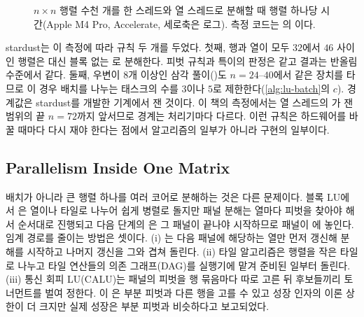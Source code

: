\begin{figure}[htbp]
\centering
{}
\caption{$n\times n$ 행렬 수천 개를 한 스레드와 열 스레드로 분해할 때 행렬 하나당 시간(Apple M4 Pro, Accelerate, 세로축은 로그). 측정 코드는 의 이다.}
\label{fig:lu-amx}
\end{figure}

stardust는 이 측정에 따라 규칙 두 개를 두었다. 첫째, 행과 열이 모두 $32$에서 $46$ 사이인 행렬은  대신 블록 없는 로 분해한다. 피벗 규칙과 특이의 판정은 같고 결과는 반올림 수준에서 같다. 둘째, 우변이 $8$개 이상인 삼각 풀이()도 $n=24$--$40$에서 같은 장치를 타므로 이 경우 배치를 나누는 태스크의 수를 $3$이나 $5$로 제한한다(\cref{alg:lu-batch}의 $c$). 경계값은 stardust를 개발한 기계에서 잰 것이다. 이 책의 측정에서는 열 스레드의 가 잰 범위의 끝 $n=72$까지 앞서므로 경계는 처리기마다 다르다. 이런 규칙은 하드웨어를 바꿀 때마다 다시 재야 한다는 점에서 알고리즘의 일부가 아니라 구현의 일부이다.

\subsection{Parallelism Inside One Matrix}

배치가 아니라 큰 행렬 하나를 여러 코어로 분해하는 것은 다른 문제이다. 블록 LU에서 은 열이나 타일로 나누어 쉽게 병렬로 돌지만 패널 분해는 열마다 피벗을 찾아야 해서 순서대로 진행되고 다음 단계의 은 그 패널이 끝나야 시작하므로 패널이 에 놓인다. 임계 경로를 줄이는 방법은 셋이다. (i) 는 다음 패널에 해당하는 열만 먼저 갱신해 분해를 시작하고 나머지 갱신을 그와 겹쳐 돌린다. (ii) 타일 알고리즘은 행렬을 작은 타일로 나누고 타일 연산들의 의존 그래프(DAG)를 실행기에 맡겨 준비된 일부터 돌린다. (iii) 통신 회피 LU(CALU)는 패널의 피벗을 행 묶음마다 따로 고른 뒤 후보들끼리 토너먼트를 벌여 정한다\cite{grigori2011calu}. 이 은 부분 피벗과 다른 행을 고를 수 있고 성장 인자의 이론 상한이 더 크지만 실제 성장은 부분 피벗과 비슷하다고 보고되었다.

